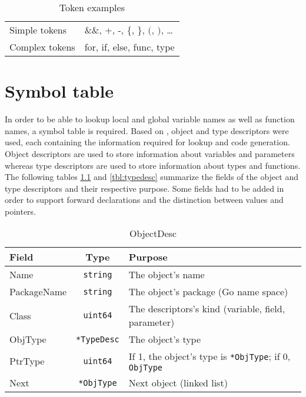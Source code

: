 \documentclass[a4paper]{scrreprt}
\begin{document}
    \begin{table}[htb]
    \centering
    \begin{tabular}{ll}
        \toprule
        Simple tokens & \&\&, +, -, \{, \}, $($, $)$, \dots \\
        Complex tokens & for, if, else, func, type \\
        \bottomrule
    \end{tabular}
    \caption{Token examples}
    \label{tbl:tokens}
    \end{table}

  \chapter{Symbol table}
    In order to be able to lookup local and global variable names as well as function names, a symbol table is required. Based on \cite{wir96}, object and type descriptors were used, each containing the information required for lookup and code generation. Object descriptors are used to store information about variables and parameters whereas type descriptors are used to store information about types and functions.\\
    The following tables \ref{tbl:objectdesc} and \ref{tbl:typedesc} summarize the fields of the object and type descriptors and their respective purpose. Some fields had to be added in order to support forward declarations and the distinction between values and pointers.
      \begin{table}[htb]
      \centering
      \begin{tabular}{lcl}
        \toprule
        \textbf{Field} & \textbf{Type} & \textbf{Purpose}\\ 
        \midrule
        Name & \texttt{string} & The object's name\\
        PackageName & \texttt{string} & The object's package (Go name space)\\
        Class & \texttt{uint64} & The descriptors's kind (variable, field, parameter)\\
        ObjType & \texttt{*TypeDesc} & The object's type\\
        PtrType & \texttt{uint64} & If 1, the object's type is \texttt{*ObjType}; if 0, \texttt{ObjType}\\
        Next & \texttt{*ObjType} & Next object (linked list)\\
        \bottomrule
      \end{tabular}
      \caption{ObjectDesc}
      \label{tbl:objectdesc}
      \end{table}
\end{document}
